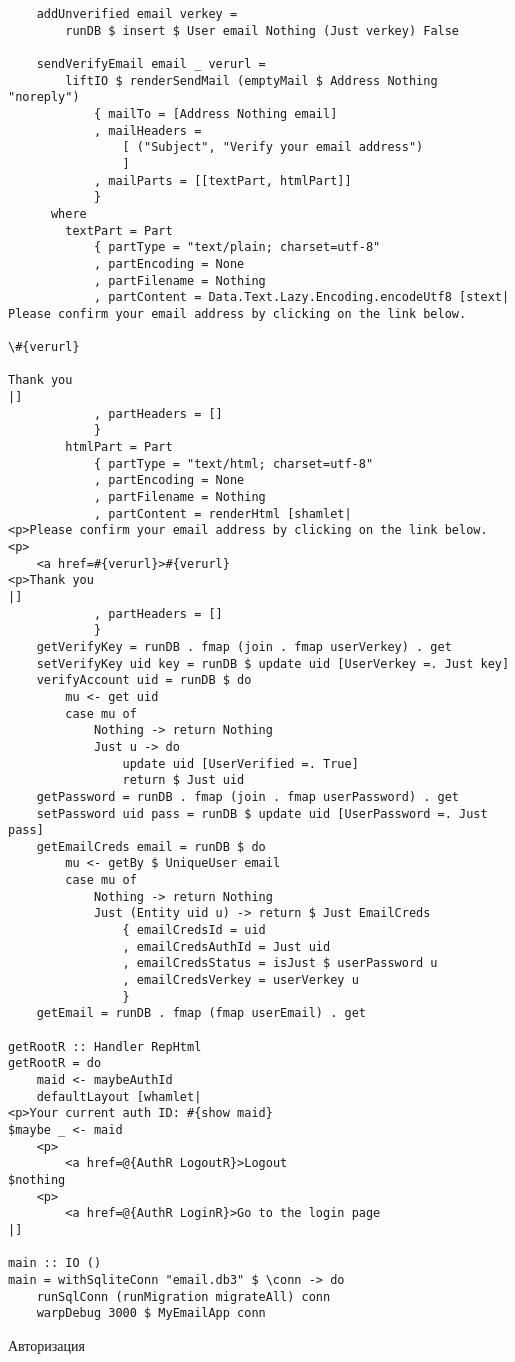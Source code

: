 \begin{lstlisting}
    addUnverified email verkey =
        runDB $ insert $ User email Nothing (Just verkey) False

    sendVerifyEmail email _ verurl =
        liftIO $ renderSendMail (emptyMail $ Address Nothing "noreply")
            { mailTo = [Address Nothing email]
            , mailHeaders =
                [ ("Subject", "Verify your email address")
                ]
            , mailParts = [[textPart, htmlPart]]
            }
      where
        textPart = Part
            { partType = "text/plain; charset=utf-8"
            , partEncoding = None
            , partFilename = Nothing
            , partContent = Data.Text.Lazy.Encoding.encodeUtf8 [stext|
Please confirm your email address by clicking on the link below.

\#{verurl}

Thank you
|]
            , partHeaders = []
            }
        htmlPart = Part
            { partType = "text/html; charset=utf-8"
            , partEncoding = None
            , partFilename = Nothing
            , partContent = renderHtml [shamlet|
<p>Please confirm your email address by clicking on the link below.
<p>
    <a href=#{verurl}>#{verurl}
<p>Thank you
|]
            , partHeaders = []
            }
    getVerifyKey = runDB . fmap (join . fmap userVerkey) . get
    setVerifyKey uid key = runDB $ update uid [UserVerkey =. Just key]
    verifyAccount uid = runDB $ do
        mu <- get uid
        case mu of
            Nothing -> return Nothing
            Just u -> do
                update uid [UserVerified =. True]
                return $ Just uid
    getPassword = runDB . fmap (join . fmap userPassword) . get
    setPassword uid pass = runDB $ update uid [UserPassword =. Just pass]
    getEmailCreds email = runDB $ do
        mu <- getBy $ UniqueUser email
        case mu of
            Nothing -> return Nothing
            Just (Entity uid u) -> return $ Just EmailCreds
                { emailCredsId = uid
                , emailCredsAuthId = Just uid
                , emailCredsStatus = isJust $ userPassword u
                , emailCredsVerkey = userVerkey u
                }
    getEmail = runDB . fmap (fmap userEmail) . get

getRootR :: Handler RepHtml
getRootR = do
    maid <- maybeAuthId
    defaultLayout [whamlet|
<p>Your current auth ID: #{show maid}
$maybe _ <- maid
    <p>
        <a href=@{AuthR LogoutR}>Logout
$nothing
    <p>
        <a href=@{AuthR LoginR}>Go to the login page
|]

main :: IO ()
main = withSqliteConn "email.db3" $ \conn -> do
    runSqlConn (runMigration migrateAll) conn
    warpDebug 3000 $ MyEmailApp conn
\end{lstlisting}
Авторизация

